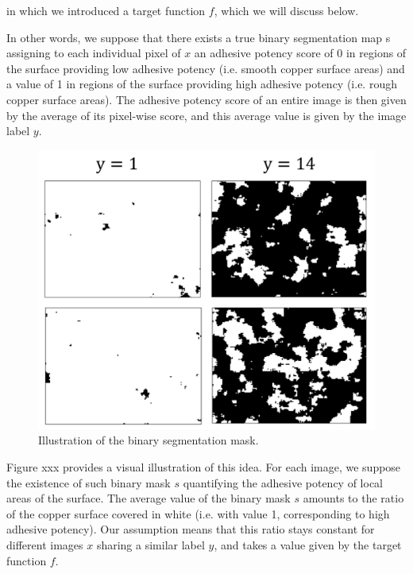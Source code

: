 \documentclass[10pt,twocolumn,letterpaper]{article}
\begin{document}
in which we introduced a target function $f$, which we will discuss below.

In other words, we suppose that there exists a true binary segmentation map
s assigning to each individual pixel of $x$ an adhesive potency score of 0 
in regions of the surface providing low adhesive potency (i.e. smooth copper surface areas)
and a value of 1 in regions of the surface providing high adhesive potency (i.e. rough copper surface areas).
The adhesive potency score of an entire image is then given by the average of its pixel-wise score,
and this average value is given by the image label $y$.

\begin{figure}[h]
	\centering
	\includegraphics[width=0.9\linewidth]{"./figures/Figure5"}
	\caption{
		Illustration of the binary segmentation mask.
	}
\end{figure}

Figure xxx provides a visual illustration of this idea.
For each image, we suppose the existence of such binary mask $s$
quantifying the adhesive potency of local areas of the surface.
The average value of the binary mask $s$ amounts to the ratio of the
copper surface covered in white (i.e. with value 1, corresponding to high adhesive potency).
Our assumption means that this ratio stays constant for different images $x$ sharing a similar label $y$,
and takes a value given by the target function $f$.
\end{document}
